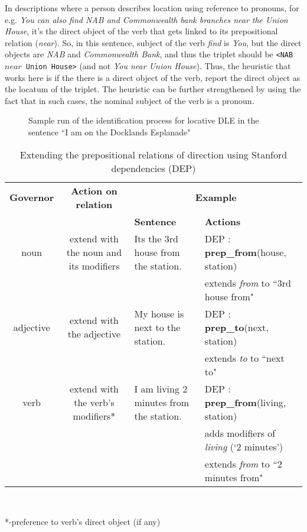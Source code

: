 \documentclass{acm_proc_article-sp}
\begin{document}
In descriptions where a person describes location using reference to pronouns, for e.g. \textit{You can also find NAB and Commonwealth bank branches near the Union House}, it's the direct object of the verb that gets linked to its prepositional relation (\textit{near}). So, in this sentence, subject of the verb \textit{find} is \textit{You}, but the direct objects are \textit{NAB} and \textit{Commonwealth Bank}, and thus the triplet should be \texttt{<NAB $near$ Union House>} (and not \textit{You near Union House}). Thus, the heuristic that works here is if the there is a direct object of the verb, report the direct object as the locatum of the triplet. The heuristic can be further strengthened by using the fact that in such cases, the nominal subject of the verb is a pronoun.
\begin{figure}
\centering
\caption{Sample run of the identification process for locative DLE in the sentence  ``I am on the Docklands Esplanade"}
\label{fig:phase1}
\end{figure}
\begin{table*}
\centering
\caption{Extending the prepositional relations of direction using Stanford dependencies (DEP)}
\begin{tabular}{|c|c|p{4cm}|p{5cm}|} \hline
\textbf{Governor}&\textbf{Action on relation}&\multicolumn{2}{|c|}{\textbf{Example}} \\ \cline{3-4} 
&&\textbf{Sentence}&\textbf{Actions}\\ \hline
noun & extend with the noun and its modifiers&Its the 3rd house from the station.&DEP : \textbf{prep\_from}(house, station) \\&&&extends \textit{from} to ``3rd house from" \\ \hline
adjective & extend with the adjective&My house is next to the station.&DEP : {\textbf{prep\_to}}(next, station) \\&&& extends \textit{to} to ``next to"\\ \hline
verb & extend with the verb's modifiers*&I am living 2 minutes from the station.&DEP : \textbf{prep\_from}(living, station)\\&&& adds modifiers of \textit{living} (`2 minutes')\\&&& extends \textit{from} to ``2 minutes from"\\ 
\hline\end{tabular}
\\ \begin{flushleft}
*-preference to verb's direct object (if any)
\end{flushleft}
\label{table:partial}
\end{table*}
\newpage
\end{document}
